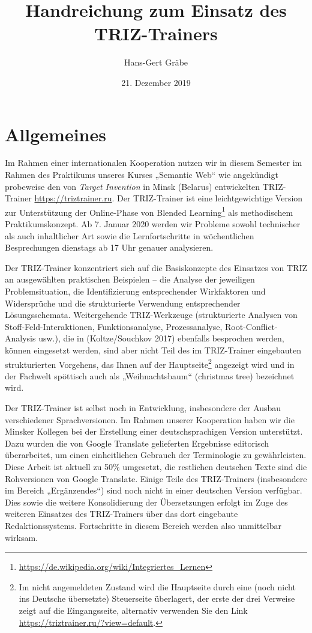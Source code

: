\documentclass[11pt,a4paper]{article}
\title{Handreichung zum Einsatz des TRIZ-Trainers}
\author{Hans-Gert Gr\"abe}
\date{21. Dezember 2019}
\begin{document}
\maketitle

\section{Allgemeines}

Im Rahmen einer internationalen Kooperation nutzen wir in diesem Semester im
Rahmen des Praktikums unseres Kurses „Semantic Web“ wie angekündigt probeweise
den von \emph{Target Invention} in Minsk (Belarus) entwickelten TRIZ-Trainer
\url{https://triztrainer.ru}.  Der TRIZ-Trainer ist eine leichtgewichtige
Version zur Unterstützung der Online-Phase von Blended
Learning\footnote{\url{https://de.wikipedia.org/wiki/Integriertes_Lernen}} als
methodischem Praktikumskonzept.  Ab 7. Januar 2020 werden wir Probleme sowohl
technischer als auch inhaltlicher Art sowie die Lernfortschritte in
wöchentlichen Besprechungen dienstags ab 17 Uhr genauer analysieren. 

Der TRIZ-Trainer konzentriert sich auf die Basiskonzepte des Einsatzes von
TRIZ an ausgewählten praktischen Beispielen -- die Analyse der jeweiligen
Problemsituation, die Identifizierung entsprechender Wirkfaktoren und
Widersprüche und die strukturierte Verwendung entsprechender Lösungsschemata.
Weitergehende TRIZ-Werkzeuge (strukturierte Analysen von
Stoff-Feld-Interaktionen, Funktionsanalyse, Prozessanalyse,
Root-Conflict-Analysis usw.), die in (Koltze/Souchkov 2017) ebenfalls
besprochen werden, können eingesetzt werden, sind aber nicht Teil des im
TRIZ-Trainer eingebauten strukturierten Vorgehens, das Ihnen auf der
Hauptseite\footnote{Im nicht angemeldeten Zustand wird die Hauptseite durch
  eine (noch nicht ins Deutsche übersetzte) Steuerseite überlagert, der erste
  der drei Verweise zeigt auf die Eingangsseite, alternativ verwenden Sie den
  Link \url{https://triztrainer.ru/?view=default}.} angezeigt wird und in der
Fachwelt spöttisch auch als „Weihnachtsbaum“ (christmas tree) bezeichnet wird.

Der TRIZ-Trainer ist selbst noch in Entwicklung, insbesondere der Ausbau
verschiedener Sprachversionen.  Im Rahmen unserer Kooperation haben wir die
Minsker Kollegen bei der Erstellung einer deutschsprachigen Version
unterstützt.  Dazu wurden die von Google Translate gelieferten Ergebnisse
editorisch überarbeitet, um einen einheitlichen Gebrauch der Terminologie zu
gewährleisten. Diese Arbeit ist aktuell zu 50\% umgesetzt, die restlichen
deutschen Texte sind die Rohversionen von Google Translate.  Einige Teile des
TRIZ-Trainers (insbesondere im Bereich „Ergänzendes“) sind noch nicht in einer
deutschen Version verfügbar. Dies sowie die weitere Konsolidierung der
Übersetzungen erfolgt im Zuge des weiteren Einsatzes des TRIZ-Trainers über
das dort eingebaute Redaktionssystems. Fortschritte in diesem Bereich werden
also unmittelbar wirksam.
\end{document}
